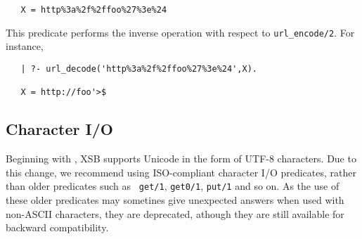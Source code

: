 \begin{description}
\begin{verbatim}
   X = http%3a%2f%2ffoo%27%3e%24
\end{verbatim}

   This predicate performs the inverse operation with respect to 
   \texttt{url\_encode/2}. For instance, 
\begin{verbatim}
   | ?- url_decode('http%3a%2f%2ffoo%27%3e%24',X).

   X = http://foo'>$
\end{verbatim}

\end{description}

\subsection{Character I/O}
Beginning with \version{}, XSB supports Unicode in the form of UTF-8
characters.  Due to this change, we recommend using ISO-compliant
character I/O predicates, rather than older predicates such as {\tt
  get/1}, {\tt get0/1}, {\tt put/1} and so on.  As the use of these
older predicates may sometines give unexpected answers when used with
non-ASCII characters, they are deprecated, athough they are still
available for backward compatibility.


